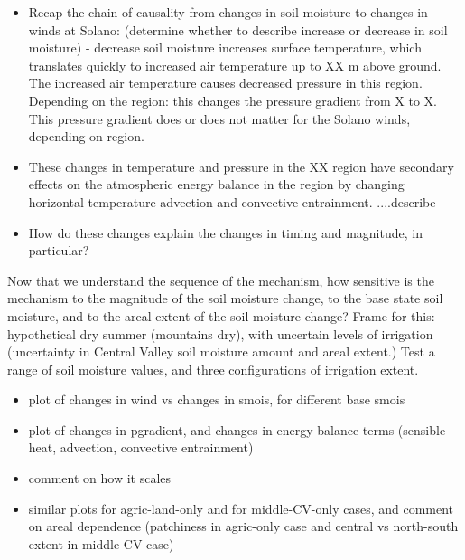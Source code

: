 \documentclass[12pt]{amsart}
\begin{document}
\begin{itemize}
\item Recap the chain of causality from changes in soil moisture to changes in winds at Solano: (determine whether to describe increase or decrease in soil moisture) - decrease soil moisture increases surface temperature, which translates quickly to increased air temperature up to XX m above ground.  The increased air temperature causes decreased pressure in this region.  Depending on the region: this changes the pressure gradient from X to X.  This pressure gradient does or does not matter for the Solano winds, depending on region.
\item These changes in temperature and pressure in the XX region have secondary effects on the atmospheric energy balance in the region by changing horizontal temperature advection and convective entrainment.  ....describe
\item How do these changes explain the changes in timing and magnitude, in particular?
\end{itemize}

Now that we understand the sequence of the mechanism, how sensitive is the mechanism to the magnitude of the soil moisture change, to the base state soil moisture, and to the areal extent of the soil moisture change?  Frame for this: hypothetical dry summer (mountains dry), with uncertain levels of irrigation (uncertainty in Central Valley soil moisture amount and areal extent.)  Test a range of soil moisture values, and three configurations of irrigation extent.

\begin{itemize}
\item plot of changes in wind vs changes in smois, for different base smois
\item plot of changes in pgradient, and changes in energy balance terms (sensible heat, advection, convective entrainment)
\item comment on how it scales
\item similar plots for agric-land-only and for middle-CV-only cases, and comment on areal dependence (patchiness in agric-only case and central vs north-south extent in middle-CV case)
\end{itemize}
\end{document}
